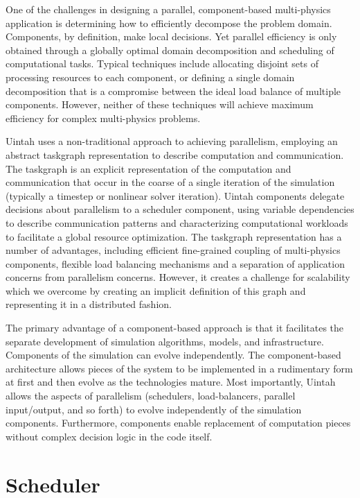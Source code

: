 \documentclass[12pt]{report}
\begin{document}
One of the challenges in designing a parallel, component-based
multi-physics application is determining how to efficiently decompose
the problem domain. Components, by definition, make local
decisions. Yet parallel efficiency is only obtained through a globally
optimal domain decomposition and scheduling of computational
tasks. Typical techniques include allocating disjoint sets of
processing resources to each component, or defining a single domain
decomposition that is a compromise between the ideal load balance of
multiple components. However, neither of these techniques will achieve
maximum efficiency for complex multi-physics problems.

Uintah uses a non-traditional approach to achieving parallelism,
employing an abstract taskgraph representation to describe computation
and communication. The taskgraph is an explicit representation of the
computation and communication that occur in the coarse of a single
iteration of the simulation (typically a timestep or nonlinear solver
iteration). Uintah components delegate decisions about parallelism to
a scheduler component, using variable dependencies to describe
communication patterns and characterizing computational workloads to
facilitate a global resource optimization. The taskgraph
representation has a number of advantages, including efficient
fine-grained coupling of multi-physics components, flexible load
balancing mechanisms and a separation of application concerns from
parallelism concerns. However, it creates a challenge for scalability
which we overcome by creating an implicit definition of this graph and
representing it in a distributed fashion.

The primary advantage of a component-based approach is that it
facilitates the separate development of simulation algorithms, models,
and infrastructure. Components of the simulation can evolve
independently. The component-based architecture allows pieces of the
system to be implemented in a rudimentary form at first and then
evolve as the technologies mature. Most importantly, Uintah allows the
aspects of parallelism (schedulers, load-balancers, parallel
input/output, and so forth) to evolve independently of the simulation
components. Furthermore, components enable replacement of computation
pieces without complex decision logic in the code itself.

\section{Scheduler}
\end{document}
